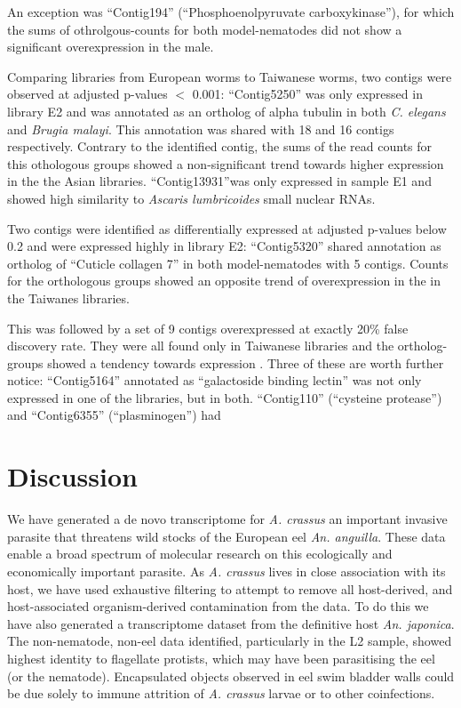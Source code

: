 \documentclass[10pt]{bmc_article}
\newenvironment{bmcformat}{\begin{raggedright}\baselineskip20pt\sloppy\setboolean{publ}{false}}{\end{raggedright}\baselineskip20pt\sloppy}
\begin{document}
\begin{bmcformat}
An exception was ``Contig194'' (``Phosphoenolpyruvate
carboxykinase''), for which the sums of othrolgous-counts for both
model-nematodes did not show a significant overexpression in the male.


Comparing libraries from European worms to Taiwanese worms, two
contigs were observed at adjusted p-values $<$ 0.001: ``Contig5250''
was only expressed in library E2 and was annotated as an ortholog of
alpha tubulin in both \textit{C. elegans} and \textit{Brugia
  malayi}. This annotation was shared with
18 and 16
  contigs respectively. Contrary to the identified contig, the sums of
  the read counts for this othologous groups showed a non-significant
  trend towards higher expression in the the Asian
  libraries. ``Contig13931''was only expressed in sample E1 and showed
  high similarity to \textit{Ascaris lumbricoides} small nuclear RNAs.

  Two contigs were identified as differentially expressed at adjusted
  p-values below 0.2 and were expressed highly in library E2:
  ``Contig5320'' shared annotation as ortholog of ``Cuticle collagen
  7'' in both model-nematodes with
  5 contigs.
    Counts for the orthologous groups showed an opposite trend of
    overexpression in the in the Taiwanes libraries.

    This was followed by a set of
    9 contigs
    overexpressed at exactly 20\% false discovery rate. They were all
    found only in Taiwanese libraries and the ortholog-groups showed a
    tendency towards expression . Three of these are worth further
    notice: ``Contig5164'' annotated as ``galactoside binding lectin''
    was not only expressed in one of the libraries, but in
    both. ``Contig110'' (``cysteine protease'') and ``Contig6355''
    (``plasminogen'') had



\section*{Discussion}

We have generated a de novo transcriptome for \textit{A. crassus} an
important invasive parasite that threatens wild stocks of the European
eel \textit{An. anguilla}. These data enable a broad spectrum of
molecular research on this ecologically and economically important
parasite. As \textit{A. crassus} lives in close association with its
host, we have used exhaustive filtering to attempt to remove all
host-derived, and host-associated organism-derived contamination from
the data. To do this we have also generated a transcriptome dataset
from the definitive host \textit{An. japonica}. The non-nematode,
non-eel data identified, particularly in the L2 sample, showed highest
identity to flagellate protists, which may have been parasitising the
eel (or the nematode). Encapsulated objects observed in eel swim
bladder walls \cite{heitlinger_massive_2009} could be due solely to
immune attrition of \textit{A. crassus} larvae or to other
coinfections.


\end{bmcformat}
\end{document}
